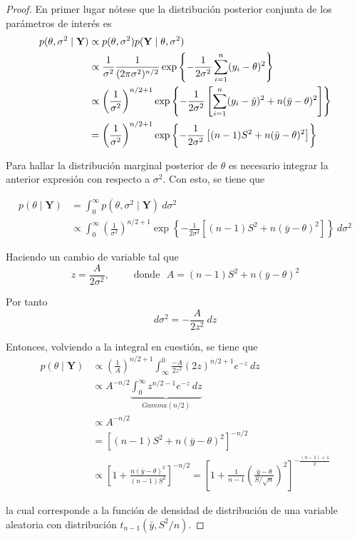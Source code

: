 \documentclass[
  10pt,
  spanish,
]{book}
\theoremstyle{definition}
\theoremstyle{definition}
\theoremstyle{definition}
\theoremstyle{definition}
\theoremstyle{remark}
\begin{document}
\begin{proof}
{}En primer lugar nótese que la distribución posterior conjunta de los parámetros de interés es
\begin{align}
\label{eq:PropThetaSigma2}
p(\theta,\sigma^2 \mid \mathbf{Y})& \propto p(\theta,\sigma^2)p(\mathbf{Y} \mid \theta,\sigma^2) \notag \\
& \propto \frac{1}{\sigma^2}\frac{1}{(2\pi\sigma^2)^{n/2}}\exp\left\{-\frac{1}{2\sigma^2}\sum_{i=1}^n(y_i-\theta)^2\right\} \notag\\
& \propto \left(\frac{1}{\sigma^2}\right)^{n/2+1}
\exp\left\{-\frac{1}{2\sigma^2}\left[\sum_{i=1}^n(y_i-\bar{y})^2+n(\bar{y}-\theta)^2\right]\right\} \notag \\
&= \left(\frac{1}{\sigma^2}\right)^{n/2+1}
\exp\left\{-\frac{1}{2\sigma^2}\left[(n-1)S^2+n(\bar{y}-\theta)^2\right]\right\}
\end{align}

Para hallar la distribución marginal posterior de \(\theta\) es necesario integrar la anterior expresión con respecto a \(\sigma^2\). Con esto, se tiene que

\begin{align*}
p(\theta \mid \mathbf{Y})&= \int_0^{\infty} p(\theta,\sigma^2 \mid \mathbf{Y}) \ d\sigma^2 \\
&\propto \int_0^{\infty} \left(\frac{1}{\sigma^2}\right)^{n/2+1}
\exp\left\{-\frac{1}{2\sigma^2}\left[(n-1)S^2+n(\bar{y}-\theta)^2\right]\right\} \ d\sigma^2
\end{align*}

Haciendo un cambio de variable tal que
\begin{equation*}
z=\frac{A}{2\sigma^2}, \ \ \ \ \ \ \ \ \ \ \ \text{donde} \ \ \ A=(n-1)S^2+n(\bar{y}-\theta)^2
\end{equation*}

Por tanto
\begin{equation*}
d\sigma^2=-\frac{A}{2z^2} \ dz
\end{equation*}

Entonces, volviendo a la integral en cuestión, se tiene que
\begin{align*}
p(\theta \mid \mathbf{Y})& \propto
\left(\frac{1}{A}\right)^{n/2+1}\int_{\infty}^{0} \frac{-A}{2z^2} (2z)^{n/2+1}e^{-z} \ dz \\
&\propto A^{-n/2}\underbrace{\int_{0}^{\infty} z^{n/2-1}e^{-z}\ dz}_{Gamma(n/2)}\\
&\propto A^{-n/2}\\
&= [(n-1)S^2+n(\bar{y}-\theta)^2]^{-n/2}\\
&\propto \left[1+\frac{n(\bar{y}-\theta)^2}{(n-1)S^2}\right]^{-n/2}
=\left[1+\frac{1}{n-1}\left(\frac{\bar{y}-\theta}{S/\sqrt{n}}\right)^2\right]^{-\frac{(n-1)+1}{2}}
\end{align*}

la cual corresponde a la función de densidad de distribución de una variable aleatoria con distribución \(t_{n-1}(\bar{y},S^2/n)\).
\end{proof}
\end{document}

